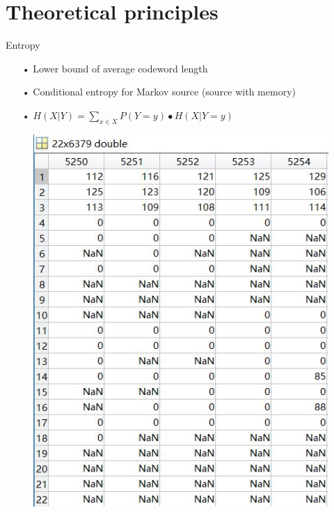 \documentclass[notes=hide]{beamer}
\begin{document}
\section{Theoretical principles}
\begin{frame}


   \begin{block}{Entropy}
   	\begin{itemize}
   		\item [•] Lower bound of average codeword length
		\item [•] Conditional entropy for Markov source (source with memory)
		\item [•] $H(X|Y)=\sum\limits_{x\in X}^{}P(Y=y)\bullet H(X|Y=y)$
   	\end{itemize}
   \end{block}

   \begin{figure}
   	\includegraphics[scale=0.4]{Vortrag/ACE.JPG}
   \end{figure}
\end{frame}




\newpage
\end{document}
